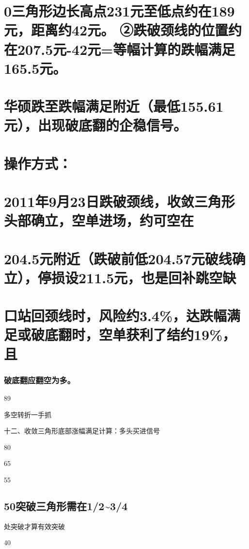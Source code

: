 \documentclass{article}
\begin{document}
\section{0三角形边长高点231元至低点约在189元，距离约42元。 ②跌破颈线的位置约在207.5元-42元=等幅计算的跌幅满足165.5元。}

\section{华硕跌至跌幅满足附近（最低155.61元），出现破底翻的企稳信号。}

\section{操作方式：}

\section{2011年9月23日跌破颈线，收敛三角形头部确立，空单进场，约可空在}

\section{204.5元附近（跌破前低204.57元破线确立），停损设211.5元，也是回补跳空缺}

\section{口站回颈线时，风险约3.4\%，达跌幅满足或破底翻时，空单获利了结约19\%，且}

\subsubsection{破底翻应翻空为多。}

89

\clearpage

多空转折一手抓

十二、收敛三角形底部涨幅满足计算：多头买进信号

80

65

55

\subsection{50突破三角形需在1/2\textasciitilde{}3/4}

处突破才算有效突破

40
\end{document}
